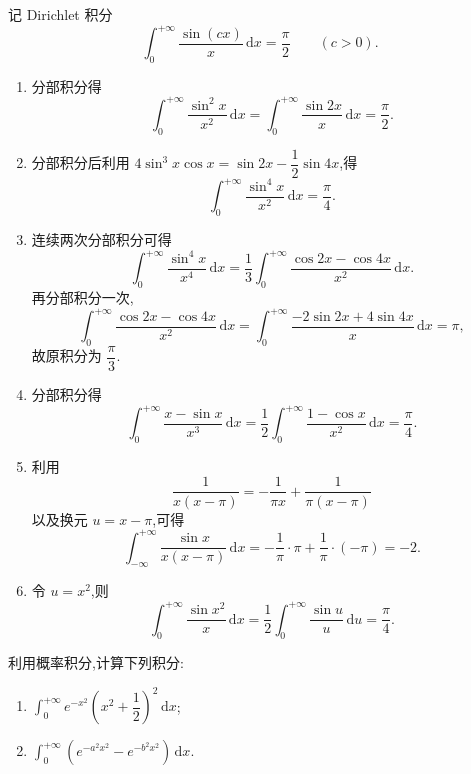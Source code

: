 \begin{solution}
  记 Dirichlet 积分
  \[
    \displaystyle\int_0^{+\infty}\dfrac{\sin(cx)}{x}\,\mathrm{d}x=\dfrac{\pi}{2}
    \qquad(c>0).
  \]
  \begin{enumerate}
    \item 分部积分得
          \[
            \displaystyle\int_0^{+\infty}\dfrac{\sin^2x}{x^2}\,\mathrm{d}x
            =\int_0^{+\infty}\dfrac{\sin2x}{x}\,\mathrm{d}x=\dfrac{\pi}{2}.
          \]
    \item 分部积分后利用
          $4\sin^3x\cos x=\sin2x-\dfrac{1}{2}\sin4x$,得
          \[
            \displaystyle\int_0^{+\infty}\dfrac{\sin^4x}{x^2}\,\mathrm{d}x
            =\dfrac{\pi}{4}.
          \]
    \item 连续两次分部积分可得
          \[
            \displaystyle\int_0^{+\infty}\dfrac{\sin^4x}{x^4}\,\mathrm{d}x
            =\dfrac{1}{3}\int_0^{+\infty}\dfrac{\cos2x-\cos4x}{x^2}\,\mathrm{d}x.
          \]
          再分部积分一次,
          \[
            \displaystyle\int_0^{+\infty}\dfrac{\cos2x-\cos4x}{x^2}\,\mathrm{d}x
            =\int_0^{+\infty}\dfrac{-2\sin2x+4\sin4x}{x}\,\mathrm{d}x=\pi,
          \]
          故原积分为 $\dfrac{\pi}{3}$.
    \item 分部积分得
          \[
            \displaystyle\int_0^{+\infty}\dfrac{x-\sin x}{x^3}\,\mathrm{d}x
            =\dfrac{1}{2}\int_0^{+\infty}\dfrac{1-\cos x}{x^2}\,\mathrm{d}x
            =\dfrac{\pi}{4}.
          \]
    \item 利用
          \[
            \dfrac{1}{x(x-\pi)}=-\dfrac{1}{\pi x}+\dfrac{1}{\pi(x-\pi)}
          \]
          以及换元 $u=x-\pi$,可得
          \[
            \displaystyle\int_{-\infty}^{+\infty}\dfrac{\sin x}{x(x-\pi)}\,\mathrm{d}x
            =-\dfrac{1}{\pi}\cdot\pi+\dfrac{1}{\pi}\cdot(-\pi)=-2.
          \]
    \item 令 $u=x^2$,则
          \[
            \displaystyle\int_0^{+\infty}\dfrac{\sin x^2}{x}\,\mathrm{d}x
            =\dfrac{1}{2}\int_0^{+\infty}\dfrac{\sin u}{u}\,\mathrm{d}u
            =\dfrac{\pi}{4}.
          \]
  \end{enumerate}
\end{solution}

\begin{example}
  利用概率积分,计算下列积分:
  \begin{enumerate}
    \item $\displaystyle\int_0^{+\infty}e^{-x^2}\left(x^2+\dfrac{1}{2}\right)^2\,\mathrm{d}x$;
    \item $\displaystyle\int_0^{+\infty}\left(e^{-a^2x^2}-e^{-b^2x^2}\right)\,\mathrm{d}x$.
  \end{enumerate}
\end{example}
\exampleblank

